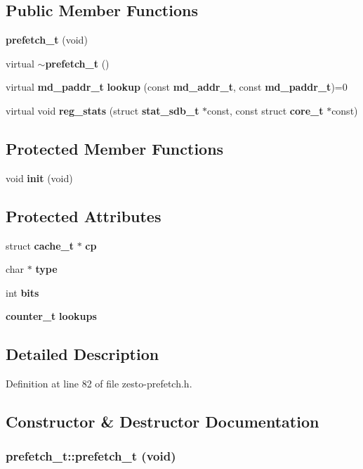 \subsection*{Public Member Functions}
\begin{CompactItemize}
\item 
{\bf prefetch\_\-t} (void)
\item 
virtual {\bf $\sim$prefetch\_\-t} ()
\item 
virtual {\bf md\_\-paddr\_\-t} {\bf lookup} (const {\bf md\_\-addr\_\-t}, const {\bf md\_\-paddr\_\-t})=0
\item 
virtual void {\bf reg\_\-stats} (struct {\bf stat\_\-sdb\_\-t} $\ast$const, const struct {\bf core\_\-t} $\ast$const)
\end{CompactItemize}
\subsection*{Protected Member Functions}
\begin{CompactItemize}
\item 
void {\bf init} (void)
\end{CompactItemize}
\subsection*{Protected Attributes}
\begin{CompactItemize}
\item 
struct {\bf cache\_\-t} $\ast$ {\bf cp}
\item 
char $\ast$ {\bf type}
\item 
int {\bf bits}
\item 
{\bf counter\_\-t} {\bf lookups}
\end{CompactItemize}


\subsection{Detailed Description}


Definition at line 82 of file zesto-prefetch.h.

\subsection{Constructor \& Destructor Documentation}
\subsubsection[{prefetch\_\-t}]{\setlength{\rightskip}{0pt plus 5cm}prefetch\_\-t::prefetch\_\-t (void)}\label{classprefetch__t_2b7a04b9c8b103944a24a51d5280fa60}




